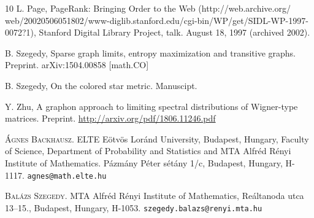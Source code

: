 \documentclass[a4wider]{amsart}
\theoremstyle{definitionbreak}\newtheorem{D}[theorem]{Definition}
\theoremstyle{definitionbreak}\newtheorem*{D*}{Definition}
\begin{document}
\begin{thebibliography}{10}
 L. Page, PageRank: Bringing Order to the Web (http://web.archive.org/
web/20020506051802/www-diglib.stanford.edu/cgi-bin/WP/get/SIDL-WP-1997-0072?1), Stanford Digital Library Project, talk. August 18, 1997 (archived 2002). 



 B. Szegedy, Sparse graph limits, entropy maximization and transitive graphs. Preprint.  	arXiv:1504.00858 [math.CO]

 B. Szegedy, On the colored star metric. Manuscipt. 

 Y. Zhu, A graphon approach to limiting spectral distributions of Wigner-type matrices. Preprint. \url{http://arxiv.org/pdf/1806.11246.pdf}
 
\end{thebibliography}

\textsc{\'Agnes Backhausz.} ELTE E\"otv\"os Lor\'and University, Budapest, Hungary, Faculty of Science, Department of Probability and Statistics and MTA Alfr\'ed R\'enyi Institute of Mathematics. P\'azm\'any P\'eter s\'et\'any 1/c, Budapest, Hungary, H-1117. \texttt{agnes@math.elte.hu}

\textsc{Bal\'azs Szegedy.} MTA Alfr\'ed R\'enyi Institute of Mathematics, Re\'altanoda utca 13--15., Budapest, Hungary, H-1053.  \texttt{szegedy.balazs@renyi.mta.hu}
\end{document}
